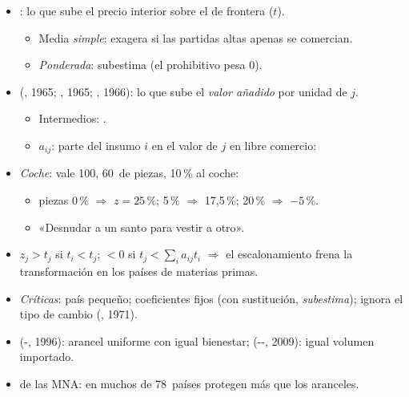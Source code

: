 \documentclass{article}
\begin{document}
\begin{columnas}
\begin{itemize}
\item {}: lo que sube el precio interior sobre el de frontera ($t$).
  \begin{itemize}
  \item Media \emph{simple}: exagera si las partidas altas apenas se comercian.
  \item \emph{Ponderada}: subestima (el prohibitivo pesa 0).
  \end{itemize}
\item {} (, 1965; , 1965; , 1966): lo que sube el \emph{valor añadido} por unidad de $j$.
  \begin{itemize}
  \item Intermedios: .
  \item $a_{ij}$: parte del insumo $i$ en el valor de $j$ en libre comercio:
  \end{itemize}
\item \emph{Coche}: vale 100, 60~de piezas, 10\,\% al coche:
  \begin{itemize}
  \item piezas 0\,\% $\Rightarrow$ $z=25$\,\%; 5\,\% $\Rightarrow$ 17,5\,\%; 20\,\% $\Rightarrow$ $-5$\,\%.
  \item «Desnudar a un santo para vestir a otro».
  \end{itemize}
\item $z_j>t_j$ si $t_i<t_j$; $<0$ si $t_j<\sum_ia_{ij}t_i$ $\Rightarrow$ el escalonamiento frena la transformación en los países de materias primas.
\item \emph{Críticas}: país pequeño; coeficientes fijos (con sustitución, \emph{subestima}); ignora el tipo de cambio (, 1971).
\item {} (-, 1996): arancel uniforme con igual bienestar;  (--, 2009): igual volumen importado.
\item {} de las MNA: en muchos de 78~países protegen más que los aranceles.
\end{itemize}


\end{columnas}
\end{document}
